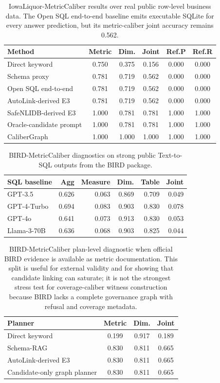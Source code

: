 \documentclass[letterpaper]{article}
\begin{document}
\begin{table}[h]
\centering
\scriptsize
\begin{tabular}{lccccc}
\toprule
Method & Metric & Dim. & Joint & Ref.P & Ref.R \\
\midrule
Direct keyword & 0.750 & 0.375 & 0.156 & 0.000 & 0.000 \\
Schema proxy & 0.781 & 0.719 & 0.562 & 0.000 & 0.000 \\
Open SQL end-to-end & 0.781 & 0.719 & 0.562 & 0.000 & 0.000 \\
AutoLink-derived E3 & 0.781 & 0.719 & 0.562 & 0.000 & 0.000 \\
SafeNLIDB-derived E3 & 1.000 & 0.781 & 0.781 & 1.000 & 1.000 \\
Oracle-candidate prompt & 1.000 & 0.781 & 0.781 & 1.000 & 1.000 \\
CaliberGraph & 1.000 & 1.000 & 1.000 & 1.000 & 1.000 \\
\bottomrule
\end{tabular}
\caption{IowaLiquor-MetricCaliber results over real public row-level business data. The Open SQL end-to-end baseline emits executable SQLite for every answer prediction, but its metric-caliber joint accuracy remains 0.562.}
\end{table}

\begin{table}[h]
\centering
\scriptsize
\begin{tabular}{lrrrrr}
\toprule
SQL baseline & Agg & Measure & Dim. & Table & Joint \\
\midrule
GPT-3.5 & 0.626 & 0.063 & 0.869 & 0.709 & 0.049 \\
GPT-4-Turbo & 0.694 & 0.083 & 0.903 & 0.830 & 0.078 \\
GPT-4o & 0.641 & 0.073 & 0.913 & 0.830 & 0.053 \\
Llama-3-70B & 0.636 & 0.068 & 0.903 & 0.825 & 0.044 \\
\bottomrule
\end{tabular}
\caption{BIRD-MetricCaliber diagnostics on strong public Text-to-SQL outputs from the BIRD package.}
\end{table}

\begin{table}[h]
\centering
\scriptsize
\begin{tabular}{lccc}
\toprule
Planner & Metric & Dim. & Joint \\
\midrule
Direct keyword & 0.199 & 0.917 & 0.189 \\
Schema-RAG & 0.830 & 0.811 & 0.665 \\
AutoLink-derived E3 & 0.830 & 0.811 & 0.665 \\
Candidate-only graph planner & 0.830 & 0.811 & 0.665 \\
\bottomrule
\end{tabular}
\caption{BIRD-MetricCaliber plan-level diagnostic when official BIRD evidence is available as metric documentation. This split is useful for external validity and for showing that candidate linking can saturate; it is not the strongest stress test for coverage-caliber witness construction because BIRD lacks a complete governance graph with refusal and coverage metadata.}
\end{table}
\end{document}
